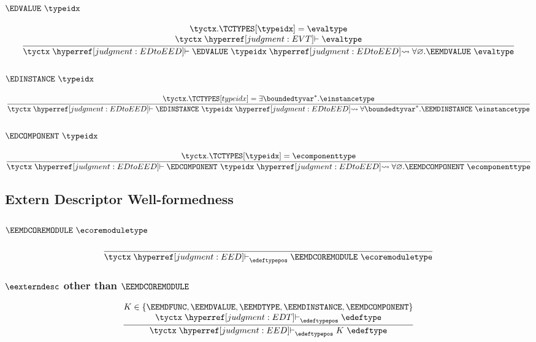\subsubsection{$\EDVALUE~\typeidx$}
\[
  \frac{
    \begin{array}{@{}c@{}}
    \tyctx.\TCTYPES[\typeidx] = \evaltype\\
    \tyctx \vdashh!EVT! \evaltype\\
    \end{array}
  }{
    \tyctx \vdashh!EDtoEED! \EDVALUE~\typeidx \leadstoh!EDtoEED! \forall\varnothing.\EEMDVALUE~\evaltype
  }
\]

\subsubsection{$\EDINSTANCE~\typeidx$}
\[
  \frac{
    \tyctx.\TCTYPES[typeidx] = \exists\boundedtyvar^\ast.\einstancetype
  }{
    \tyctx \vdashh!EDtoEED! \EDINSTANCE~\typeidx \leadstoh!EDtoEED! \forall\boundedtyvar^\ast.\EEMDINSTANCE~\einstancetype
  }
\]

\subsubsection{$\EDCOMPONENT~\typeidx$}
\[
  \frac{
    \tyctx.\TCTYPES[\typeidx] = \ecomponenttype
  }{
    \tyctx \vdashh!EDtoEED! \EDCOMPONENT~\typeidx \leadstoh!EDtoEED! \forall\varnothing.\EEMDCOMPONENT~\ecomponenttype
  }
\]

\subsection{Extern Descriptor Well-formedness}
\label{judgment:EED}

\subsubsection{$\EEMDCOREMODULE~\ecoremoduletype$}
\[
  \frac{
  }{
    \tyctx \vdashh!EED!_\edeftypepos \EEMDCOREMODULE~\ecoremoduletype
  }
\]

\subsubsection{$\eexterndesc$ other than $\EEMDCOREMODULE$}
\[
  \frac{
    \begin{array}{@{}c@{}}
    K \in \{ \EEMDFUNC, \EEMDVALUE, \EEMDTYPE, \EEMDINSTANCE, \EEMDCOMPONENT \}\\
    \tyctx \vdashh!EDT!_\edeftypepos \edeftype\\
    \end{array}
  }{
    \tyctx \vdashh!EED!_\edeftypepos K~\edeftype
  }
\]

